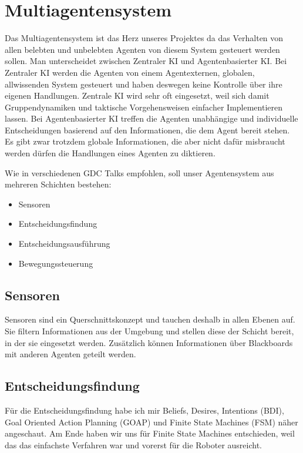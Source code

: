\section{Multiagentensystem}

Das Multiagentensystem ist das Herz unseres Projektes da das Verhalten von allen belebten und unbelebten Agenten von diesem System gesteuert werden sollen. Man unterscheidet zwischen Zentraler KI und Agentenbasierter KI. Bei Zentraler KI werden die Agenten von einem Agentexternen, globalen, allwissenden System gesteuert und haben deswegen keine Kontrolle über ihre eigenen Handlungen. Zentrale KI wird sehr oft eingesetzt, weil sich damit Gruppendynamiken und taktische Vorgehensweisen einfacher Implementieren lassen. Bei Agentenbasierter KI treffen die Agenten unabhängige und individuelle Entscheidungen basierend auf den Informationen, die dem Agent bereit stehen. Es gibt zwar trotzdem globale Informationen, die aber nicht dafür misbraucht werden dürfen die Handlungen eines Agenten zu diktieren.

Wie in verschiedenen GDC \cite{YouTube_2019}\cite{YouTube_2022}\cite{YouTube_2023} Talks empfohlen, soll unser Agentensystem aus mehreren Schichten bestehen:

\begin{itemize}
\item Sensoren
\item Entscheidungsfindung
\item Entscheidungsausführung
\item Bewegungssteuerung
\end{itemize}

\subsection{Sensoren}

Sensoren sind ein Querschnittskonzept und tauchen deshalb in allen Ebenen auf. Sie filtern Informationen aus der Umgebung und stellen diese der Schicht bereit, in der sie eingesetzt werden. Zusätzlich können Informationen über Blackboards mit anderen Agenten geteilt werden.

\subsection{Entscheidungsfindung}

Für die Entscheidungsfindung habe ich mir Beliefs, Desires, Intentions (BDI), Goal Oriented Action Planning (GOAP) und Finite State Machines (FSM) näher angeschaut. Am Ende haben wir uns für Finite State Machines entschieden, weil das das einfachste Verfahren war und vorerst für die Roboter ausreicht.

